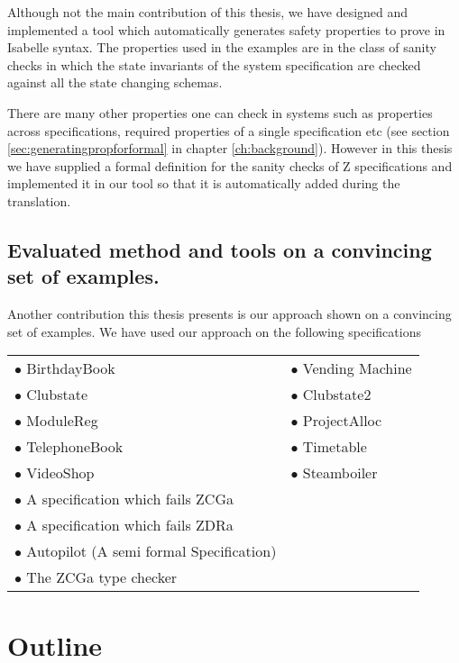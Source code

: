 Although not the main contribution of this thesis, we have designed and implemented a tool which automatically generates safety properties to prove in Isabelle syntax. The properties used in the examples are in the class of sanity checks in which the state invariants of the system specification are checked against all the state changing schemas.

There are many other properties one can check in systems such as properties across specifications, required properties of a single specification etc (see section \ref{sec:generatingpropforformal} in chapter \ref{ch:background}). However in this thesis we have supplied a formal definition for the sanity checks of Z specifications and implemented it in our tool so that it is automatically added during the translation.


\subsection{Evaluated method and tools on a convincing set of examples.}


Another contribution this thesis presents is our approach shown on a convincing set of examples. We have used our approach on the following specifications

\begin{tabular}{l l}
$\bullet$ BirthdayBook \cite{spiveyreferencemanual} & $\bullet$ Vending Machine \cite{pp} \\
$\bullet$ Clubstate \cite{essenceofz} & $\bullet$ Clubstate2 \cite{essenceofz} \\
$\bullet$ ModuleReg \cite{essenceofz} & $\bullet$ ProjectAlloc \cite{essenceofz} \\
$\bullet$ TelephoneBook & $\bullet$ Timetable \cite{essenceofz} \\
$\bullet$ VideoShop \cite{essenceofz} & $\bullet$ Steamboiler \\
$\bullet$ A specification which fails ZCGa & \\
$\bullet$ A specification which fails ZDRa & \\
$\bullet$ Autopilot (A semi formal Specification) \cite{Butler96} & \\
$\bullet$ The ZCGa type checker & \\
\end{tabular}

\section{Outline}

